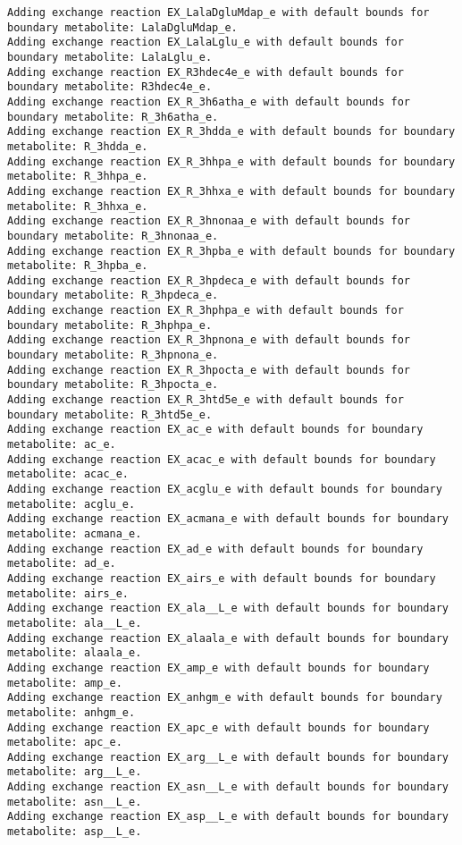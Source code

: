 \documentclass[
  letterpaper,
  DIV=11,
  numbers=noendperiod]{scrartcl}
\begin{document}
\begin{verbatim}
Adding exchange reaction EX_LalaDgluMdap_e with default bounds for boundary metabolite: LalaDgluMdap_e.
Adding exchange reaction EX_LalaLglu_e with default bounds for boundary metabolite: LalaLglu_e.
Adding exchange reaction EX_R3hdec4e_e with default bounds for boundary metabolite: R3hdec4e_e.
Adding exchange reaction EX_R_3h6atha_e with default bounds for boundary metabolite: R_3h6atha_e.
Adding exchange reaction EX_R_3hdda_e with default bounds for boundary metabolite: R_3hdda_e.
Adding exchange reaction EX_R_3hhpa_e with default bounds for boundary metabolite: R_3hhpa_e.
Adding exchange reaction EX_R_3hhxa_e with default bounds for boundary metabolite: R_3hhxa_e.
Adding exchange reaction EX_R_3hnonaa_e with default bounds for boundary metabolite: R_3hnonaa_e.
Adding exchange reaction EX_R_3hpba_e with default bounds for boundary metabolite: R_3hpba_e.
Adding exchange reaction EX_R_3hpdeca_e with default bounds for boundary metabolite: R_3hpdeca_e.
Adding exchange reaction EX_R_3hphpa_e with default bounds for boundary metabolite: R_3hphpa_e.
Adding exchange reaction EX_R_3hpnona_e with default bounds for boundary metabolite: R_3hpnona_e.
Adding exchange reaction EX_R_3hpocta_e with default bounds for boundary metabolite: R_3hpocta_e.
Adding exchange reaction EX_R_3htd5e_e with default bounds for boundary metabolite: R_3htd5e_e.
Adding exchange reaction EX_ac_e with default bounds for boundary metabolite: ac_e.
Adding exchange reaction EX_acac_e with default bounds for boundary metabolite: acac_e.
Adding exchange reaction EX_acglu_e with default bounds for boundary metabolite: acglu_e.
Adding exchange reaction EX_acmana_e with default bounds for boundary metabolite: acmana_e.
Adding exchange reaction EX_ad_e with default bounds for boundary metabolite: ad_e.
Adding exchange reaction EX_airs_e with default bounds for boundary metabolite: airs_e.
Adding exchange reaction EX_ala__L_e with default bounds for boundary metabolite: ala__L_e.
Adding exchange reaction EX_alaala_e with default bounds for boundary metabolite: alaala_e.
Adding exchange reaction EX_amp_e with default bounds for boundary metabolite: amp_e.
Adding exchange reaction EX_anhgm_e with default bounds for boundary metabolite: anhgm_e.
Adding exchange reaction EX_apc_e with default bounds for boundary metabolite: apc_e.
Adding exchange reaction EX_arg__L_e with default bounds for boundary metabolite: arg__L_e.
Adding exchange reaction EX_asn__L_e with default bounds for boundary metabolite: asn__L_e.
Adding exchange reaction EX_asp__L_e with default bounds for boundary metabolite: asp__L_e.

\end{verbatim}
\end{document}
